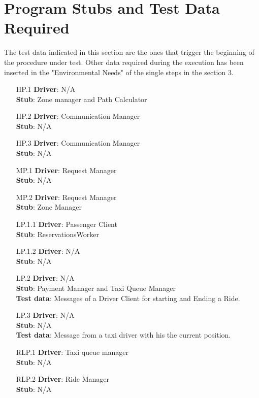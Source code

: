 \section{Program Stubs and Test Data Required}

The test data indicated in this section are the ones that trigger the beginning of the procedure under test. Other data required during the execution has been inserted in the "Environmental Needs" of the single steps in the section 3.
\begin{itemize}
    \item [HP.1] \textbf{Driver}: N/A \\\textbf{Stub}: Zone manager and Path Calculator
    \item [HP.2] \textbf{Driver}: Communication Manager \\\textbf{Stub}: N/A
    \item [HP.3] \textbf{Driver}: Communication Manager \\\textbf{Stub}: N/A
    \item [MP.1] \textbf{Driver}: Request Manager \\\textbf{Stub}: N/A
    \item [MP.2] \textbf{Driver}: Request Manager \\\textbf{Stub}: Zone Manager
    \item [LP.1.1] \textbf{Driver}: Passenger Client \\\textbf{Stub}: ReservationsWorker
    \item [LP.1.2] \textbf{Driver}: N/A \\\textbf{Stub}: N/A
    \item [LP.2] \textbf{Driver}: N/A \\\textbf{Stub}: Payment Manager and Taxi Queue Manager \\\textbf{Test data}: Messages of a Driver Client for starting and Ending a Ride.
    \item [LP.3] \textbf{Driver}: N/A \\\textbf{Stub}: N/A \\\textbf{Test data}: Message from a taxi driver with his the current position.
    \item [RLP.1] \textbf{Driver}:  Taxi queue manager \\\textbf{Stub}: N/A
    \item [RLP.2] \textbf{Driver}: Ride Manager \\\textbf{Stub}: N/A
\end{itemize}